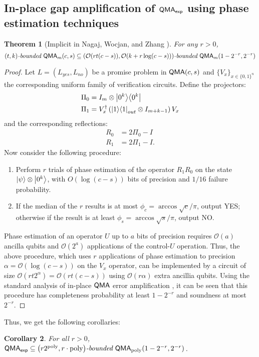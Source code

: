 \documentclass[11pt]{article}
\newtheorem{theorem}{Theorem}
\newtheorem{corollary}[theorem]{Corollary}
\theoremstyle{definition}
\theoremstyle{remark}
\newcommand\QMA{{\sf{QMA}}}
\newcommand\QMAexp{{\sf{QMA}_{exp}}}
\newcommand\bddQMA[5]{{\left(#1,#2\right)}\textit{-bounded }\QMA_{#3}(#4,#5)}
\newcommand{\poly}{\textrm{poly}}
\begin{document}
\subsection{In-place gap amplification of $\QMAexp$ using phase estimation techniques}
\begin{theorem}[Implicit in Nagaj, Wocjan, and Zhang \cite{nwz11}] For any $r>0$, \[\bddQMA{t}{k}{m}{c}{s}\subseteq\bddQMA{\mathcal{O}(rt(c-s))}{\mathcal{O}(k+r\log(c-s))}{m}{1-2^{-r}}{2^{-r}}\]
\end{theorem}
\begin{proof}
	Let $L=(L_{yes}, L_{no})$ be a promise problem in $\QMA(c,s)$ and $\{V_x\}_{x\in\{0,1\}^n}$ the corresponding uniform family of verification circuits.
Define the projectors:
\begin{align}
\Pi_0 &= I_m \otimes {\left\vert{0^k}\right\rangle}{\left\langle{0^k}\right\vert} \\
\Pi_1 &= V^\dagger_x \left({\left\vert{1}\right\rangle}{\left\langle{1}\right\vert}_{out} \otimes I_{m+k-1}\right) V_x
\end{align}
and the corresponding reflections:
\begin{align}
R_0 &= 2\Pi_0 - I \\
R_1 &= 2\Pi_1 - I.
\end{align}
Now consider the following procedure:
\begin{enumerate}
\item Perform $r$ trials of phase estimation of the operator $R_1R_0$ on the state ${\left\vert{\psi}\right\rangle}\otimes {\left\vert{0^k}\right\rangle}$, with $O(\log(c-s))$ bits of precision and $1/16$ failure probability. 
\item If the median of the $r$ results is at most $\phi_c = \arccos\sqrt{c}/\pi$, output YES; otherwise if the result is at least $\phi_s = \arccos\sqrt{s}/\pi$, output NO.
\end{enumerate}
Phase estimation of an operator $U$ up to $a$ bits of precision requires $\mathcal{O}(a)$ ancilla qubits and $\mathcal{O}(2^a)$ applications of the control-$U$ operation.  Thus, the above procedure, which uses $r$ applications of phase estimation to precision $\alpha=\mathcal{O}(\log(c-s))$ on the $V_x$ operator, can be implemented by a circuit of size $\mathcal{O}(rt2^{\alpha})=\mathcal{O}(rt(c-s))$ using $\mathcal{O}(r\alpha)$ extra ancillia qubits.
 Using the standard analysis of in-place $\QMA$ error amplification \cite{mw05,nwz11}, it can be seen that this procedure has completeness probability at least $1-2^{-r}$ and soundness at most $2^{-r}$.
\end{proof}

Thus, we get the following corollaries:
\begin{corollary}\label{obvious1}For all $r>0$,
$\QMAexp\subseteq\bddQMA{r2^{\poly}}{r\cdot \poly}{\poly}{1-2^{-r}}{2^{-r}}$.
\end{corollary}
\end{document}
